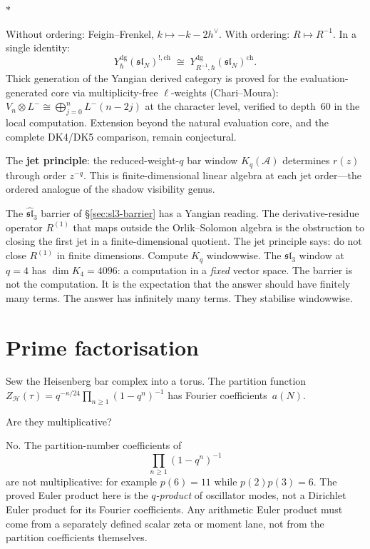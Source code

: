 \documentclass[11pt]{article}
\newcommand{\cA}{\mathcal{A}}
\newcommand{\cH}{\mathcal{H}}
\newcommand{\fsl}{\mathfrak{sl}}
\newcommand{\Ydg}{Y^{\mathrm{dg}}}
\newcommand{\sep}{\bigskip\begin{center}$*$\end{center}\medskip}
\begin{document}
\sep

Without ordering: Feigin--Frenkel,
$k \mapsto -k - 2h^\vee$.  With ordering:
$R \mapsto R^{-1}$.  In a single identity:
\[
\Ydg_\hbar(\fsl_N)^{!,\mathrm{ch}}
\;\cong\;
\Ydg_{R^{-1},\hbar}(\fsl_N)^{\mathrm{ch}}.
\]
Thick generation of the Yangian derived category is proved for
the evaluation-generated core via multiplicity-free
$\ell$-weights (Chari--Moura): $V_n \otimes L^- \cong
\bigoplus_{j=0}^n L^-(n-2j)$ at the character level, verified
to depth~$60$ in the local computation.  Extension beyond the
natural evaluation core, and the complete DK4/DK5 comparison,
remain conjectural.

The \textbf{jet principle}: the reduced-weight-$q$ bar window
$K_q(\cA)$ determines $r(z)$ through order $z^{-q}$.  This is
finite-dimensional linear algebra at each jet order---the
ordered analogue of the shadow visibility genus.

The $\widehat{\fsl}_3$ barrier of
\S\ref{sec:sl3-barrier} has a Yangian reading.  The
derivative-residue operator $R^{(1)}$ that maps outside the
Orlik--Solomon algebra is the obstruction to closing the first
jet in a finite-dimensional quotient.  The jet principle says:
do not close $R^{(1)}$ in finite dimensions.  Compute $K_q$
windowwise.  The $\fsl_3$ window at $q = 4$ has
$\dim K_4 = 4096$: a computation in a \textit{fixed} vector
space.  The barrier is not the computation.  It is the
expectation that the answer should have finitely many terms.
The answer has infinitely many terms.  They stabilise
windowwise.


\section{Prime factorisation}
\label{sec:prime-factorisation}

Sew the Heisenberg bar complex into a torus.  The partition
function $Z_{\cH}(\tau) = q^{-\kappa/24}\prod_{n \geq 1}
(1-q^n)^{-1}$ has Fourier coefficients~$a(N)$.

Are they multiplicative?

No.  The partition-number coefficients of
\[
\prod_{n\geq1}(1-q^n)^{-1}
\]
are not multiplicative: for example $p(6)=11$ while
$p(2)p(3)=6$.  The proved Euler product here is the
\emph{$q$-product} of oscillator modes, not a Dirichlet Euler
product for its Fourier coefficients.  Any arithmetic Euler
product must come from a separately defined scalar zeta or
moment lane, not from the partition coefficients themselves.
\end{document}
